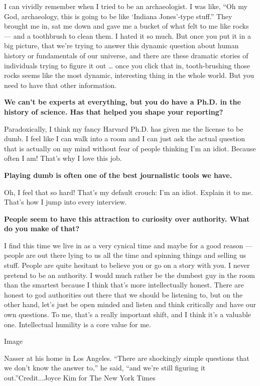 I can vividly remember when I tried to be an archaeologist. I was like,
``Oh my God, archaeology, this is going to be like `Indiana Jones'-type
stuff.'' They brought me in, sat me down and gave me a bucket of what
felt to me like rocks --- and a toothbrush to clean them. I hated it so
much. But once you put it in a big picture, that we're trying to answer
this dynamic question about human history or fundamentals of our
universe, and there are these dramatic stories of individuals trying to
figure it out \ldots{} once you click that in, tooth-brushing those
rocks seems like the most dynamic, interesting thing in the whole world.
But you need to have that other information.

\textbf{We can't be experts at everything, but you do have a Ph.D. in
the history of science. Has that helped you shape your reporting?}

Paradoxically, I think my fancy Harvard Ph.D. has given me the license
to be dumb. I feel like I can walk into a room and I can just ask the
actual question that is actually on my mind without fear of people
thinking I'm an idiot. Because often I am! That's why I love this job.

\textbf{Playing dumb is often one of the best journalistic tools we
have.}

Oh, I feel that so hard! That's my default crouch: I'm an idiot. Explain
it to me. That's how I jump into every interview.

\textbf{People seem to have this attraction to curiosity over authority.
What do you make of that?}

I find this time we live in as a very cynical time and maybe for a good
reason --- people are out there lying to us all the time and spinning
things and selling us stuff. People are quite hesitant to believe you or
go on a story with you. I never pretend to be an authority. I would much
rather be the dumbest guy in the room than the smartest because I think
that's more intellectually honest. There are honest to god authorities
out there that we should be listening to, but on the other hand, let's
just be open minded and listen and think critically and have our own
questions. To me, that's a really important shift, and I think it's a
valuable one. Intellectual humility is a core value for me.

Image

Nasser at his home in Los Angeles. ``There are shockingly simple
questions that we don't know the answer to,'' he said, ``and we're still
figuring it out.''Credit...Joyce Kim for The New York Times

